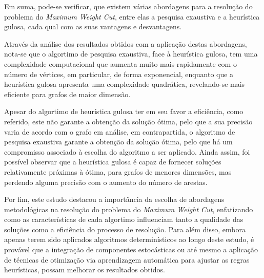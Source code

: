 \documentclass[mirror]{revdetua}
\begin{document}
Em suma, pode-se verificar, que existem várias abordagens para a resolução do problema do \textit{Maximum Weight Cut}, entre elas a pesquisa exaustiva e a heurística gulosa, cada qual com as suas vantagens e desvantagens.

Através da análise dos resultados obtidos com a aplicação destas abordagens, nota-se que o algortimo de pesquisa exaustiva, face à heurística gulosa, tem uma complexidade computacional que aumenta muito mais rapidamente com o número de vértices, em particular, de forma exponencial, enquanto que a heurística gulosa apresenta uma complexidade quadrática, revelando-se mais eficiente para grafos de maior dimensão.

Apesar do algortimo de heurística gulosa ter em seu favor a eficiência, como referido, este não garante a obtenção da solução ótima, pelo que a sua precisão varia de acordo com o grafo em análise, em contrapartida, o algoritmo de pesquisa exaustiva garante a obtenção da solução ótima, pelo que há um compromisso associado à escolha do algoritmo a ser aplicado. Ainda assim, foi possível observar que a heurística gulosa é capaz de fornecer soluções relativamente próximas à ótima, para grafos de menores dimensões, mas perdendo alguma precisão com o aumento do número de arestas.

Por fim, este estudo destacou a importância da escolha de abordagens metodológicas na resolução do problema do \textit{Maximum Weight Cut}, enfatizando como as características de cada algortimo influenciam tanto a qualidade das soluções como a eficiência do processo de resolução. Para além disso, embora apenas terem sido aplicados algoritmos determinísticos ao longo deste estudo, é provável que a integração de componentes estocásticas ou até mesmo a aplicação de técnicas de otimização via aprendizagem automática para ajustar as regras heurísticas, possam melhorar os resultados obtidos.


\end{document}
